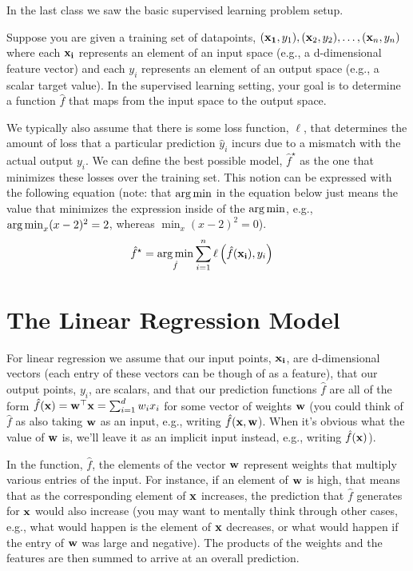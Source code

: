 \documentclass[assignment01_Solutions]{subfiles}
\begin{document}
\begin{recall}
In the last class we saw the basic supervised learning problem setup.

Suppose you are given a training set of datapoints, $(\mathbf{x_1}, y_1), (\mathbf{x}_2, y_2), \ldots, (\mathbf{x}_n, y_n)$ where each $\mathbf{x_i}$ represents an element of an input space (e.g., a d-dimensional feature vector) and each $y_i$ represents an element of an output space (e.g., a scalar target value).  In the supervised learning setting, your goal is to determine a function $\hat{f}$ that maps from the input space to the output space.

We typically also assume that there is some loss function, $\ell$, that determines the amount of loss that a particular prediction $\hat{y}_i$ incurs due to a mismatch with the actual output $y_i$.  We can define the best possible model, $\hat{f}^\star$ as the one that minimizes these losses over the training set.  This notion can be expressed with the following equation  (note: that $\operatorname*{arg\,min}$ in the equation below just means the value that minimizes the expression inside of the $\operatorname*{arg\,min}$, e.g., $\operatorname*{arg\,min}_{x} (x - 2)^2 = 2$, whereas $\min_{x} (x-2)^2 = 0$).
\begin{align}
\hat{f}^\star &= \operatorname*{arg\,min}_{\hat{f}} \sum_{i=1}^n \ell \left ( \hat{f}(\mathbf{x_i}), y_i \right )
\end{align} 

\end{recall}

\section{The Linear Regression Model}

For linear regression we assume that our input points, $\mathbf{x_i}$, are d-dimensional vectors (each entry of these vectors can be though of as a feature), that our output points, $y_i$, are scalars, and that our prediction functions $\hat{f}$ are all of the form $\hat{f}(\mathbf{x}) = \mathbf{w}^\top \mathbf{x} = \sum_{i=1}^d w_i x_i$ for some vector of weights $\mathbf{w}$ (you could think of $\hat{f}$ as also taking $\mathbf{w}$ as an input, e.g., writing $\hat{f}(\mathbf{x}, \mathbf{w}$).  When it's obvious what the value of $\mathbf{w}$ is, we'll leave it as an implicit input instead, e.g., writing $\hat{f}(\mathbf{x})$).

In the function, $\hat{f}$, the elements of the vector $\mathbf{w}$ represent weights that multiply various entries of the input.  For instance, if an element of $\mathbf{w}$ is high, that means that as the corresponding element of $\mathbf{x}$ increases, the prediction that $\hat{f}$ generates for $\mathbf{x}$ would also increase (you may want to mentally think through other cases, e.g., what would happen is the element of $\mathbf{x}$ decreases, or what would happen if the entry of $\mathbf{w}$ was large and negative).  The products of the weights and the features are then summed to arrive at an overall prediction.
\end{document}

